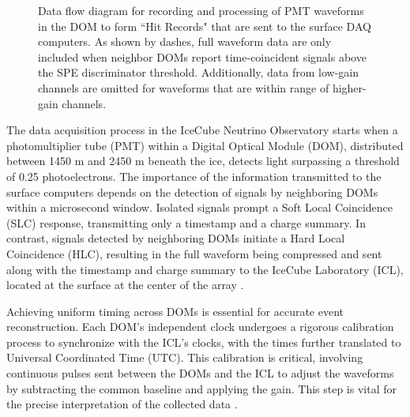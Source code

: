 \begin{figure}
    \caption{ Data flow diagram for recording and processing of PMT waveforms in the DOM to form “Hit Records" that are sent to the surface DAQ computers. As shown by dashes, full waveform data are only included when neighbor DOMs report time-coincident signals above the SPE discriminator threshold. Additionally, data from low-gain channels are omitted for waveforms that are within range of higher-gain channels.}
    \label{fig:IC3_dataflow}
\end{figure}

The data acquisition process in the IceCube Neutrino Observatory starts when a photomultiplier tube (PMT) within a Digital Optical Module (DOM), distributed between 1450 m and 2450 m beneath the ice, detects light surpassing a threshold of 0.25 photoelectrons.
The importance of the information transmitted to the surface computers depends on the detection of signals by neighboring DOMs within a microsecond window.
Isolated signals prompt a Soft Local Coincidence (SLC) response, transmitting only a timestamp and a charge summary.
In contrast, signals detected by neighboring DOMs initiate a Hard Local Coincidence (HLC), resulting in the full waveform being compressed and sent along with the timestamp and charge summary to the IceCube Laboratory (ICL), located at the surface at the center of the array \cite{IC3_thedetector}.

Achieving uniform timing across DOMs is essential for accurate event reconstruction.
Each DOM's independent clock undergoes a rigorous calibration process to synchronize with the ICL's clocks, with the times further translated to Universal Coordinated Time (UTC).
This calibration is critical, involving continuous pulses sent between the DOMs and the ICL to adjust the waveforms by subtracting the common baseline and applying the gain.
This step is vital for the precise interpretation of the collected data \cite{IC3_thedetector}.

